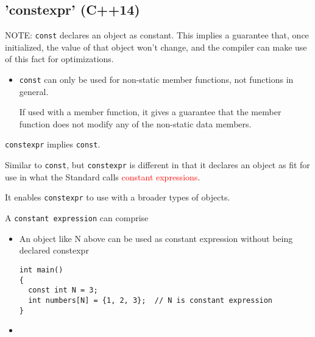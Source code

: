 \subsection{'constexpr' (C++14)}
\label{sec:constepxt_C++14}

NOTE: \verb!const! declares an object as constant.
This implies a guarantee that, once initialized, the value of that object won't
change, and the compiler can make use of this fact for optimizations.
\begin{itemize}
  
  \item  \verb!const! can only be used for non-static member functions, not functions in general. 
  
  If used with a member function, it gives a guarantee that the member function
  does not modify any of the non-static data members.
  
\end{itemize}

\verb!constexpr! implies \verb!const!.


Similar to \verb!const!, but \verb!constexpr! is different in that it declares
an object as fit for use in what the Standard calls \textcolor{red}{constant expressions}. 

It enables \verb!constexpr! to use  with a broader types of objects.

A \verb!constant expression! can comprise
\begin{itemize}
  \item  An object like N above can be used as constant expression without being declared constexpr


\begin{verbatim}
int main()
{
  const int N = 3;
  int numbers[N] = {1, 2, 3};  // N is constant expression
}
\end{verbatim}

  \item 
\end{itemize}

